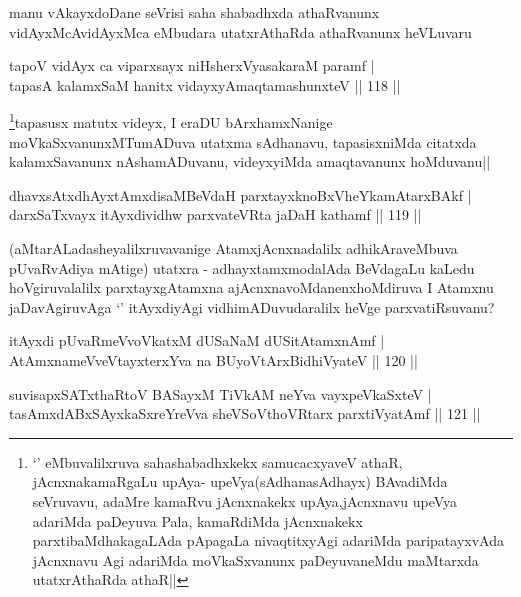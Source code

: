 \begin{artha}
manu vAkayxdoDane seVrisi saha shabadhxda athaRvanunx vidAyxMcAvidAyxMca eMbudara utatxrAthaRda athaRvanunx heVLuvaru
\end{artha}


\begin{shl}
tapoV vidAyx ca viparxsayx niHsherxVyasakaraM paramf |\\
tapasA kalamxSaM hanitx vidayxyA\s maqtamashunxteV \hfill || 118 ||
\end{shl}

\begin{artha}
\footnote{`\stext' eMbuvalilxruva sahashabadhxkekx samucacxyaveV athaR, jAcnxnakamaRgaLu upAya- upeVya(sAdhanasAdhayx) BAvadiMda seVruvavu, adaMre kamaRvu jAcnxnakekx upAya,jAcnxnavu upeVya adariMda paDeyuva Pala, kamaRdiMda jAcnxnakekx   parxtibaMdhakagaLAda pApagaLa nivaqtitxyAgi adariMda paripatayxvAda jAcnxnavu Agi adariMda moVkaSxvanunx paDeyuvaneMdu maMtarxda utatxrAthaRda athaR||}tapasusx matutx videyx, I eraDU bArxhamxNanige moVkaSxvanunxMTumADuva utatxma sAdhanavu, tapasisxniMda citatxda kalamxSavanunx nAshamADuvanu, videyxyiMda amaqtavanunx hoMduvanu||
\end{artha}

\begin{shl}
dhavxsAtxdhAyxtAmxdisaMBeVdaH parxtayxknoBxVheYkamAtarxBAkf |\\
darxSaTxvayx itAyxdividhw parxvateVRta jaDaH kathamf \hfill || 119 ||
\end{shl}

\begin{artha}
(aMtarALadasheyalilxruvavanige AtamxjAcnxnadalilx adhikAraveMbuva pUvaRvAdiya mAtige) utatxra - adhayxtamxmodalAda BeVdagaLu kaLedu hoVgiruvalalilx parxtayxgAtamxna ajAcnxnavoMdanenxhoMdiruva I Atamxnu jaDavAgiruvAga `\stext' itAyxdiyAgi vidhimADuvudaralilx heVge parxvatiRsuvanu?
\end{artha}


\begin{shl}
itAyxdi pUvaRmeVvoVkatxM dUSaNaM dUSitAtamxnAmf |\\
AtAmxnameVveVtayxterxYva na BUyoV\s tArxBidhiVyateV \hfill || 120 ||
\end{shl}

\begin{shl}
suvisapxSATxthaRtoV BASayxM TiVkAM neYva vayxpeVkaSxteV |\\
tasAmxdABxSAyxkaSxreYreVva sheVSoV\s thoVR\s tarx parxtiVyatAmf \hfill || 121 ||
\end{shl}

